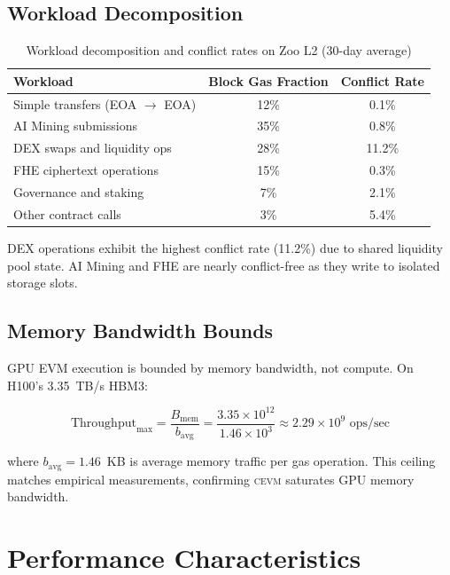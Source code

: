 \documentclass[11pt,letterpaper]{article}
\theoremstyle{definition}
\theoremstyle{remark}
\newcommand{\cevm}{\textsc{cevm}}
\begin{document}
\subsection{Workload Decomposition}

\begin{table}[h]
\centering
\begin{tabular}{lcc}
\toprule
\textbf{Workload} & \textbf{Block Gas Fraction} & \textbf{Conflict Rate} \\
\midrule
Simple transfers (EOA $\to$ EOA) & 12\% & 0.1\% \\
AI Mining submissions & 35\% & 0.8\% \\
DEX swaps and liquidity ops & 28\% & 11.2\% \\
FHE ciphertext operations & 15\% & 0.3\% \\
Governance and staking & 7\% & 2.1\% \\
Other contract calls & 3\% & 5.4\% \\
\bottomrule
\end{tabular}
\caption{Workload decomposition and conflict rates on Zoo L2 (30-day average)}
\label{tab:workload}
\end{table}

DEX operations exhibit the highest conflict rate (11.2\%) due to shared liquidity pool state.
AI Mining and FHE are nearly conflict-free as they write to isolated storage slots.

\subsection{Memory Bandwidth Bounds}

GPU EVM execution is bounded by memory bandwidth, not compute.
On H100's 3.35~TB/s HBM3:

\begin{equation}
\text{Throughput}_{\max} = \frac{B_{\text{mem}}}{b_{\text{avg}}} = \frac{3.35 \times 10^{12}}{1.46 \times 10^{3}} \approx 2.29 \times 10^{9} \text{ ops/sec}
\end{equation}

where $b_{\text{avg}} = 1.46$~KB is average memory traffic per gas operation.
This ceiling matches empirical measurements, confirming \cevm{} saturates GPU memory bandwidth.

\section{Performance Characteristics}
\label{sec:performance}
\end{document}
